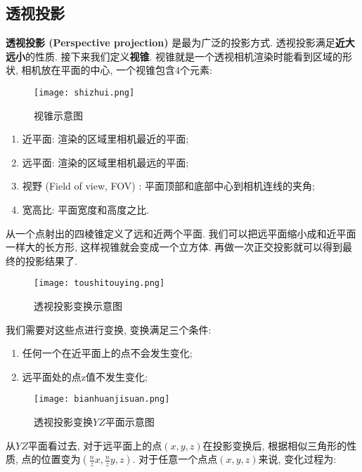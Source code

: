 \subsection{透视投影}

\textbf{透视投影 (Perspective projection) }是最为广泛的投影方式. 透视投影满足\textbf{近大远小}的性质. 接下来我们定义\textbf{视锥}. 视锥就是一个透视相机渲染时能看到区域的形状, 相机放在平面的中心, 一个视锥包含4个元素: 

\begin{figure}[H]
	\centering
	\texttt{[image: shizhui.png]}
	\caption{视锥示意图}
\end{figure}

\begin{enumerate}[itemsep=-0.5em]
	\item 近平面: 渲染的区域里相机最近的平面; 
	\item 远平面: 渲染的区域里相机最远的平面; 
	\item 视野 (Field of view, FOV) : 平面顶部和底部中心到相机连线的夹角; 
	\item 宽高比: 平面宽度和高度之比. 
\end{enumerate}

从一个点射出的四棱锥定义了远和近两个平面. 我们可以把远平面缩小成和近平面一样大的长方形, 这样视锥就会变成一个立方体. 再做一次正交投影就可以得到最终的投影结果了. 

\begin{figure}[H]
	\centering
	\texttt{[image: toushitouying.png]}
	\caption{透视投影变换示意图}
\end{figure}

我们需要对这些点进行变换, 变换满足三个条件: 
\begin{enumerate}
	\item 任何一个在近平面上的点不会发生变化; 
	\item 远平面处的点z值不发生变化; 
\end{enumerate}

\begin{figure}[H]
	\centering
	\texttt{[image: bianhuanjisuan.png]}
	\caption{透视投影变换$YZ$平面示意图}
\end{figure}

从$YZ$平面看过去, 对于远平面上的点$(x,y,z)$在投影变换后, 根据相似三角形的性质, 点的位置变为$(\frac{n}{z}x,\frac{n}{z}y,z)$. 对于任意一个点点$(x,y,z)$来说, 变化过程为: 

